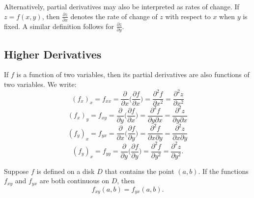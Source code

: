 \documentclass{article}
\begin{document}
Alternatively, partial derivatives may also be interpreted as rates of change. If $z=f(x,y)$, then $\frac{\partial z}{\partial x}$ denotes the rate of change of $z$ with respect to $x$ when $y$ is fixed. A similar definition follows for $\frac{\partial z}{\partial y}.$
\subsection{Higher Derivatives}
\begin{notation}
    If $f$ is a function of two variables, then its partial derivatives are also functions of two variables. We write:
    $$(f_x)_x=f_{xx}=\frac{\partial}{\partial x}\Bigg(\frac{\partial f}{\partial x}\Bigg)=\frac{\partial ^2f}{\partial x^2}=\frac{\partial ^2z}{\partial x^2}$$
    $$(f_x)_y=f_{xy}=\frac{\partial}{\partial y}\Bigg(\frac{\partial f}{\partial x}\Bigg)=\frac{\partial ^2f}{\partial y\partial x}=\frac{\partial ^2z}{\partial y\partial x}$$
    $$(f_y)_x=f_{yx}=\frac{\partial}{\partial x}\Bigg(\frac{\partial f}{\partial y}\Bigg)=\frac{\partial ^2f}{\partial x\partial y}=\frac{\partial ^2z}{\partial x\partial y}$$
    $$(f_y)_x=f_{yy}=\frac{\partial}{\partial y}\Bigg(\frac{\partial f}{\partial y}\Bigg)=\frac{\partial ^2f}{\partial y^2}=\frac{\partial ^2z}{\partial y^2}.$$
\end{notation}
\begin{theorem}
    Suppose $f$ is defined on a disk $D$ that contains the point $(a,b)$. If the functions $f_{xy}$ and $f_{yx}$ are both continuous on $D$, then 
    $$f_{xy}(a,b)=f_{yx}(a,b).$$
\end{theorem}
\end{document}
